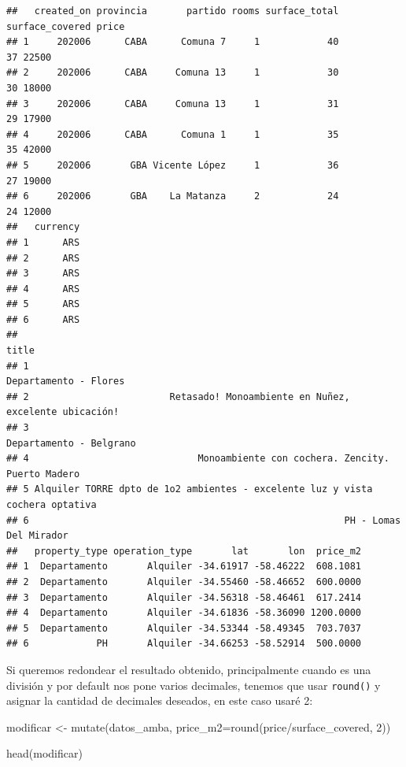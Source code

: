 \documentclass[
  spanish,
]{book}
\newenvironment{Shaded}{\begin{snugshade}}{\end{snugshade}}
\newcommand{\AttributeTok}[1]{\textcolor[rgb]{0.77,0.63,0.00}{#1}}
\newcommand{\DecValTok}[1]{\textcolor[rgb]{0.00,0.00,0.81}{#1}}
\newcommand{\FunctionTok}[1]{\textcolor[rgb]{0.00,0.00,0.00}{#1}}
\newcommand{\NormalTok}[1]{#1}
\newcommand{\OtherTok}[1]{\textcolor[rgb]{0.56,0.35,0.01}{#1}}
\newcommand{\SpecialCharTok}[1]{\textcolor[rgb]{0.00,0.00,0.00}{#1}}
\begin{document}
\begin{verbatim}
##   created_on provincia       partido rooms surface_total surface_covered price
## 1     202006      CABA      Comuna 7     1            40              37 22500
## 2     202006      CABA     Comuna 13     1            30              30 18000
## 3     202006      CABA     Comuna 13     1            31              29 17900
## 4     202006      CABA      Comuna 1     1            35              35 42000
## 5     202006       GBA Vicente López     1            36              27 19000
## 6     202006       GBA    La Matanza     2            24              24 12000
##   currency
## 1      ARS
## 2      ARS
## 3      ARS
## 4      ARS
## 5      ARS
## 6      ARS
##                                                                           title
## 1                                                         Departamento - Flores
## 2                         Retasado! Monoambiente en Nuñez, excelente ubicación!
## 3                                                       Departamento - Belgrano
## 4                              Monoambiente con cochera. Zencity. Puerto Madero
## 5 Alquiler TORRE dpto de 1o2 ambientes - excelente luz y vista cochera optativa
## 6                                                        PH - Lomas Del Mirador
##   property_type operation_type       lat       lon  price_m2
## 1  Departamento       Alquiler -34.61917 -58.46222  608.1081
## 2  Departamento       Alquiler -34.55460 -58.46652  600.0000
## 3  Departamento       Alquiler -34.56318 -58.46461  617.2414
## 4  Departamento       Alquiler -34.61836 -58.36090 1200.0000
## 5  Departamento       Alquiler -34.53344 -58.49345  703.7037
## 6            PH       Alquiler -34.66253 -58.52914  500.0000
\end{verbatim}

Si queremos redondear el resultado obtenido, principalmente cuando es una división y por default nos pone varios decimales, tenemos que usar \texttt{round()} y asignar la cantidad de decimales deseados, en este caso usaré 2:

\begin{Shaded}
\begin{Highlighting}[]
\NormalTok{modificar }\OtherTok{\textless{}{-}} \FunctionTok{mutate}\NormalTok{(datos\_amba, }\AttributeTok{price\_m2=}\FunctionTok{round}\NormalTok{(price}\SpecialCharTok{/}\NormalTok{surface\_covered, }\DecValTok{2}\NormalTok{))}

\FunctionTok{head}\NormalTok{(modificar)}
\end{Highlighting}
\end{Shaded}
\end{document}
